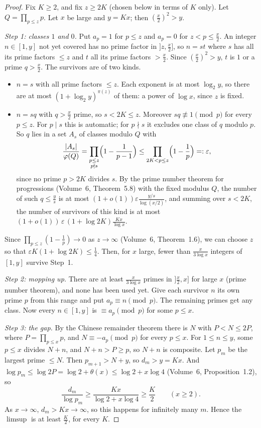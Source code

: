 \begin{proof}
Fix $K\ge2$, and fix $z\ge2K$ (chosen below in terms of $K$ only). Let $Q=\prod_{p\le z}p$. Let $x$ be large and $y=Kx$; then $(\frac x2)^2>y$.

\emph{Step 1: classes $1$ and $0$.} Put $a_p=1$ for $p\le z$ and $a_p=0$ for $z<p\le\frac x2$. An integer $n\in[1,y]$ not yet covered has no prime factor in
$]z,\frac x2]$, so $n=st$ where $s$ has all its prime factors $\le z$ and $t$ all its prime factors $>\frac x2$. Since $(\frac x2)^2>y$, $t$ is $1$ or a prime
$q>\frac x2$. The survivors are of two kinds.
\begin{itemize}
\item $n=s$ with all prime factors $\le z$. Each exponent is at most $\log_2y$, so there are at most $(1+\log_2y)^{\pi(z)}$ of them: a power of $\log x$,
since $z$ is fixed.
\item $n=sq$ with $q>\frac x2$ prime, so $s<2K\le z$. Moreover $sq\not\equiv1\pmod p$ for every $p\le z$. For $p\mid s$ this is automatic; for $p\nmid s$ it
excludes one class of $q$ modulo $p$. So $q$ lies in a set $A_s$ of classes modulo $Q$ with
\[
\frac{|A_s|}{\varphi(Q)}=\prod_{\substack{p\le z\\p\nmid s}}\Bigl(1-\frac1{p-1}\Bigr)\le\prod_{2K<p\le z}\Bigl(1-\frac1p\Bigr)=:\varepsilon,
\]
since no prime $p>2K$ divides $s$. By the prime number theorem for progressions (Volume~6, Theorem~5.8) with the fixed modulus $Q$, the number of such
$q\le\frac ys$ is at most $(1+o(1))\varepsilon\frac{y/s}{\log(x/2)}$, and summing over $s<2K$, the number of survivors of this kind is at most
$(1+o(1))\,\varepsilon\,(1+\log2K)\frac{Kx}{\log x}$.
\end{itemize}
Since $\prod_{p\le z}(1-\frac1p)\to0$ as $z\to\infty$ (Volume~6, Theorem~1.6), we can choose $z$ so that $\varepsilon K(1+\log2K)\le\frac14$. Then, for $x$ large,
fewer than $\frac x{3\log x}$ integers of $[1,y]$ survive Step~1.

\emph{Step 2: mopping up.} There are at least $\frac x{3\log x}$ primes in $]\frac x2,x]$ for large $x$ (prime number theorem), and none has been used yet.
Give each survivor $n$ its own prime $p$ from this range and put $a_p\equiv n\pmod p$. The remaining primes get any class. Now every $n\in[1,y]$ is
$\equiv a_p\pmod p$ for some $p\le x$.

\emph{Step 3: the gap.} By the Chinese remainder theorem there is $N$ with $P<N\le2P$, where $P=\prod_{p\le x}p$, and $N\equiv-a_p\pmod p$ for every
$p\le x$. For $1\le n\le y$, some $p\le x$ divides $N+n$, and $N+n>P\ge p$, so $N+n$ is composite. Let $p_m$ be the largest prime $\le N$. Then
$p_{m+1}>N+y$, so $d_m>y=Kx$. And $\log p_m\le\log2P=\log2+\theta(x)\le\log2+x\log4$ (Volume~6, Proposition~1.2), so
\[
\frac{d_m}{\log p_m}\ge\frac{Kx}{\log2+x\log4}\ge\frac K2\qquad(x\ge2).
\]
As $x\to\infty$, $d_m>Kx\to\infty$, so this happens for infinitely many $m$. Hence the $\limsup$ is at least $\frac K2$, for every $K$.
\end{proof}

